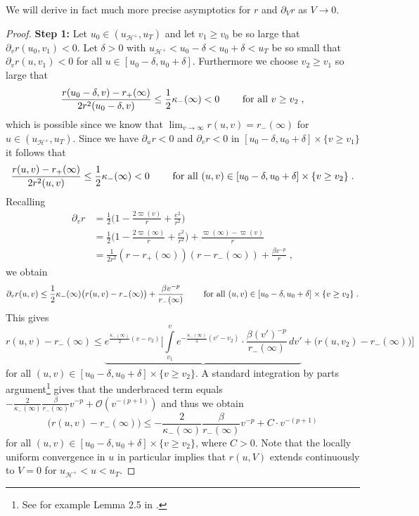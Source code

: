 \documentclass[reqno]{article}
\newcommand{\uh}{u_{\mathcal{H}^+}}
\newcommand{\rd}{\partial}
\begin{document}
We will derive in fact much more precise asymptotics for $r$ and $\partial_V r$ as $V \to 0$.
\begin{proof}
\textbf{Step 1:} Let $u_0 \in (\uh, u_T)$ and let $v_1 \geq v_0$ be so large that $\rd_v r (u_0, v_1) < 0$. Let $\delta >0$ with $\uh < u_0 - \delta < u_0 + \delta < u_T$ be so small that $\rd_v r (u,v_1) <0$ for all $u \in [u_0 - \delta, u_0 + \delta]$. Furthermore we choose $v_2 \geq v_1$ so large that $$\frac{r(u_0 - \delta, v) - r_+(\infty)}{2r^2(u_0 - \delta, v)} \leq \frac{1}{2} \kappa_-(\infty) <0 \qquad \textnormal{ for all } v \geq v_2 \;,$$
which is possible since we know that $\lim_{v \to \infty} r(u,v) = r_-(\infty)  $ for $u \in (\uh, u_T)$.  Since we have $\rd_u r <0$ and $\rd_v r< 0$ in $[u_0 - \delta, u_0 + \delta] \times \{ v \geq v_1\}$ it follows that $$\frac{r(u , v) - r_+(\infty)}{2r^2(u, v)} \leq \frac{1}{2} \kappa_-(\infty) <0 \qquad \textnormal{ for all } (u,v) \in [u_0 - \delta, u_0 + \delta] \times \{v \geq v_2\}\;.$$
Recalling
\begin{equation}\label{EqDVRS}
\begin{split}
\rd_v r &= \frac{1}{2} \Big(1 - \frac{2 \varpi(v)}{r} + \frac{e^2}{r^2}\Big) \\
&= \frac{1}{2} \Big( 1 - \frac{2\varpi(\infty)}{r} + \frac{e^2}{r^2}\Big) + \frac{\varpi(\infty) - \varpi(v)}{r} \\
&= \frac{1}{2r^2} (r - r_+(\infty))(r - r_-(\infty)) + \frac{\beta v^{-p}}{r} \;,
\end{split}
\end{equation}
we obtain $$\rd_v r(u,v) \leq \frac{1}{2} \kappa_-(\infty) \big( r(u,v) - r_-(\infty)\big) + \frac{ \beta v^{-p}}{r_-(\infty)} \qquad \textnormal{ for all } (u,v) \in [u_0 - \delta, u_0 + \delta] \times \{v \geq v_2\}\;. $$
This gives $$r(u,v) - r_-(\infty) \leq \underbrace{e^{\frac{\kappa_-(\infty)}{2} (v - v_2)} \Big[ \int\limits_{v_1}^v e^{-\frac{\kappa_-(\infty)}{2} (v' - v_2)} \cdot \frac{\beta (v')^{-p}}{r_-(\infty)} \, dv'} + \big(r(u,v_2) - r_-(\infty)\big)\Big] $$
for all $ (u,v) \in [u_0 - \delta, u_0 + \delta] \times \{v \geq v_2\}$. A standard integration by parts argument\footnote{See for example Lemma 2.5 in \cite{FouSbi20}.} gives that the underbraced term equals $- \frac{2}{\kappa_-(\infty)} \frac{\beta}{r_-(\infty)} v^{-p} + \mathcal{O}(v^{-(p+1)})$ and thus we obtain
\begin{equation}
\label{EqUniformCR}
\big(r(u,v) - r_-(\infty)\big) \leq - \frac{2}{\kappa_-(\infty)} \frac{\beta}{r_-(\infty)} v^{-p} + C \cdot v^{-(p+1)}
\end{equation}
for all $ (u,v) \in [u_0 - \delta, u_0 + \delta] \times \{v \geq v_2\}$, where $C>0$. Note that the locally uniform convergence in $u$ in particular implies that $r(u,V)$ extends continuously to $V=0$ for $\uh < u < u_T$.


\end{proof}
\end{document}
